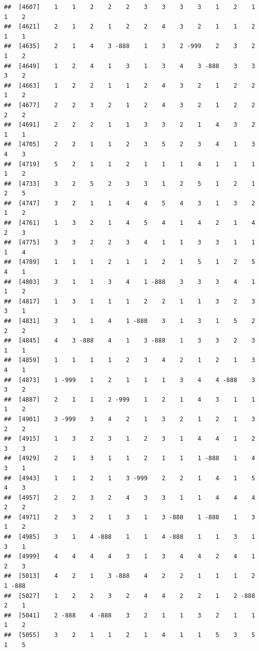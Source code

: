\documentclass[
  12pt,
  openany]{book}
\begin{document}
\begin{verbatim}
##  [4607]    1    1    2    2    2    3    3    3    3    1    2    1    1    2
##  [4621]    2    1    2    1    2    2    4    3    2    1    1    2    1    1
##  [4635]    2    1    4    3 -888    1    3    2 -999    2    3    2    1    2
##  [4649]    1    2    4    1    3    1    3    4    3 -888    3    3    3    2
##  [4663]    1    2    2    1    1    2    4    3    2    1    2    2    1    2
##  [4677]    2    2    3    2    1    2    4    3    2    1    2    2    2    2
##  [4691]    2    2    2    1    1    3    3    2    1    4    3    2    1    1
##  [4705]    2    2    1    1    2    3    5    2    3    4    1    3    4    3
##  [4719]    5    2    1    1    2    1    1    1    4    1    1    1    1    2
##  [4733]    3    2    5    2    3    3    1    2    5    1    2    1    2    5
##  [4747]    3    2    1    1    4    4    5    4    3    1    3    2    1    2
##  [4761]    1    3    2    1    4    5    4    1    4    2    1    4    2    3
##  [4775]    3    3    2    2    3    4    1    1    3    3    1    1    1    4
##  [4789]    1    1    1    2    1    1    2    1    5    1    2    5    4    1
##  [4803]    3    1    1    3    4    1 -888    3    3    3    4    1    1    2
##  [4817]    1    3    1    1    1    2    2    1    1    3    2    3    3    1
##  [4831]    3    1    1    4    1 -888    3    1    3    1    5    2    2    2
##  [4845]    4    3 -888    4    1    3 -888    1    3    3    2    3    1    1
##  [4859]    1    1    1    1    2    3    4    2    1    2    1    3    4    1
##  [4873]    1 -999    1    2    1    1    1    3    4    4 -888    3    3    2
##  [4887]    2    1    1    2 -999    1    2    1    4    3    1    1    1    2
##  [4901]    3 -999    3    4    2    1    3    2    1    2    1    3    2    2
##  [4915]    1    3    2    3    1    2    3    1    4    4    1    2    3    3
##  [4929]    2    1    3    1    1    2    1    1    1 -888    1    4    3    1
##  [4943]    1    1    2    1    3 -999    2    2    1    4    1    5    4    3
##  [4957]    2    2    3    2    4    3    3    1    1    4    4    4    2    2
##  [4971]    2    3    2    1    3    1    3 -888    1 -888    1    3    1    2
##  [4985]    3    1    4 -888    1    1    4 -888    1    1    3    1    3    1
##  [4999]    4    4    4    4    3    1    3    4    4    2    4    1    2    3
##  [5013]    4    2    1    3 -888    4    2    2    1    1    1    2    1 -888
##  [5027]    1    2    2    3    2    4    4    2    2    1    2 -888    2    1
##  [5041]    2 -888    4 -888    3    2    1    1    3    2    1    1    1    2
##  [5055]    3    2    1    1    2    1    4    1    1    5    3    5    1    5

\end{verbatim}
\end{document}
